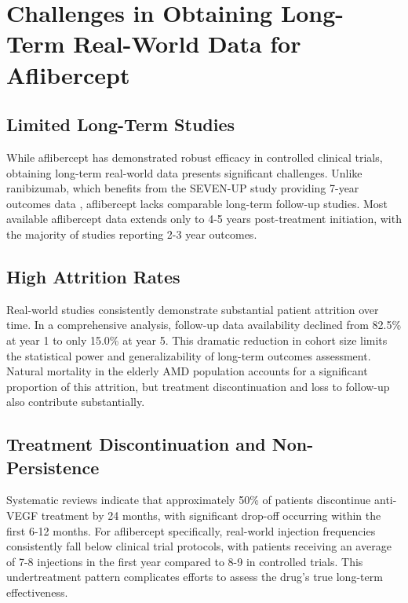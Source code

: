
\section{Challenges in Obtaining Long-Term Real-World Data for Aflibercept}

\subsection{Limited Long-Term Studies}

While aflibercept has demonstrated robust efficacy in controlled clinical trials, obtaining long-term real-world data presents significant challenges. Unlike ranibizumab, which benefits from the SEVEN-UP study providing 7-year outcomes data \citep{martinRanibizumabBevacizumabTreatment2012}, aflibercept lacks comparable long-term follow-up studies. Most available aflibercept data extends only to 4-5 years post-treatment initiation, with the majority of studies reporting 2-3 year outcomes.

\subsection{High Attrition Rates}

Real-world studies consistently demonstrate substantial patient attrition over time. In a comprehensive analysis, follow-up data availability declined from 82.5\% at year 1 to only 15.0\% at year 5. This dramatic reduction in cohort size limits the statistical power and generalizability of long-term outcomes assessment. Natural mortality in the elderly AMD population accounts for a significant proportion of this attrition, but treatment discontinuation and loss to follow-up also contribute substantially.

\subsection{Treatment Discontinuation and Non-Persistence}

Systematic reviews indicate that approximately 50\% of patients discontinue anti-VEGF treatment by 24 months, with significant drop-off occurring within the first 6-12 months. For aflibercept specifically, real-world injection frequencies consistently fall below clinical trial protocols, with patients receiving an average of 7-8 injections in the first year compared to 8-9 in controlled trials. This undertreatment pattern complicates efforts to assess the drug's true long-term effectiveness.

